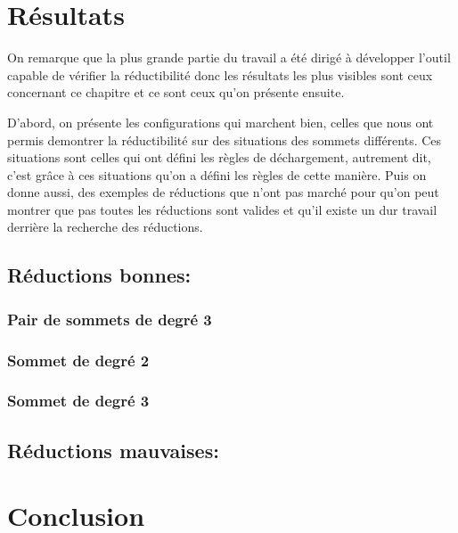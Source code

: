 \documentclass[10pt,a4paper]{article}
\begin{document}
\section{Résultats}
On remarque que la plus grande partie du travail a été dirigé à développer l'outil capable de vérifier la réductibilité donc les résultats les plus visibles sont ceux concernant ce chapitre et ce sont ceux qu'on présente ensuite.

D'abord, on présente les configurations qui marchent bien, celles que nous ont permis demontrer la réductibilité sur des situations des sommets différents. Ces situations sont celles qui ont défini les règles de déchargement, autrement dit, c'est grâce à ces situations qu'on a défini les règles de cette manière. Puis on donne aussi, des exemples de réductions que n'ont pas marché pour qu'on peut montrer que pas toutes les réductions sont valides et qu'il existe un dur travail derrière la recherche des réductions. 
 
\subsection{Réductions bonnes:}
\subsubsection{Pair de sommets de degré 3}
\subsubsection{Sommet de degré 2}
\subsubsection{Sommet de degré 3}
\subsection{Réductions mauvaises:}


\section{Conclusion}
\end{document}
